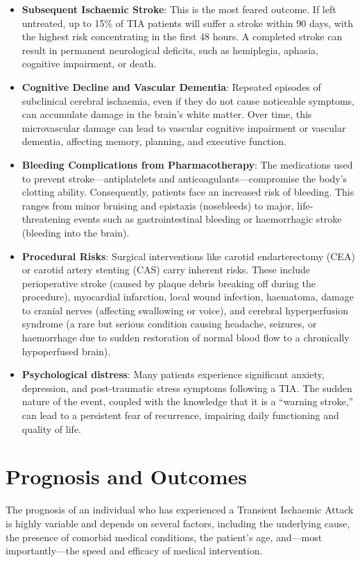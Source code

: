 \begin{itemize}
    \item \textbf{Subsequent Ischaemic Stroke}: This is the most feared outcome. If left untreated, up to 15\% of TIA patients will suffer a stroke within 90 days, with the highest risk concentrating in the first 48 hours. A completed stroke can result in permanent neurological deficits, such as hemiplegia, aphasia, cognitive impairment, or death.

    \item \textbf{Cognitive Decline and Vascular Dementia}: Repeated episodes of subclinical cerebral ischaemia, even if they do not cause noticeable symptoms, can accumulate damage in the brain's white matter. Over time, this microvascular damage can lead to vascular cognitive impairment or vascular dementia, affecting memory, planning, and executive function.

    \item \textbf{Bleeding Complications from Pharmacotherapy}: The medications used to prevent stroke---antiplatelets and anticoagulants---compromise the body's clotting ability. Consequently, patients face an increased risk of bleeding. This ranges from minor bruising and epistaxis (nosebleeds) to major, life-threatening events such as gastrointestinal bleeding or haemorrhagic stroke (bleeding into the brain).

    \item \textbf{Procedural Risks}: Surgical interventions like carotid endarterectomy (CEA) or carotid artery stenting (CAS) carry inherent risks. These include perioperative stroke (caused by plaque debris breaking off during the procedure), myocardial infarction, local wound infection, haematoma, damage to cranial nerves (affecting swallowing or voice), and cerebral hyperperfusion syndrome (a rare but serious condition causing headache, seizures, or haemorrhage due to sudden restoration of normal blood flow to a chronically hypoperfused brain).

    \item \textbf{Psychological distress}: Many patients experience significant anxiety, depression, and post-traumatic stress symptoms following a TIA. The sudden nature of the event, coupled with the knowledge that it is a ``warning stroke,'' can lead to a persistent fear of recurrence, impairing daily functioning and quality of life.
\end{itemize}

\section*{Prognosis and Outcomes}
The prognosis of an individual who has experienced a Transient Ischaemic Attack is highly variable and depends on several factors, including the underlying cause, the presence of comorbid medical conditions, the patient's age, and---most importantly---the speed and efficacy of medical intervention.


